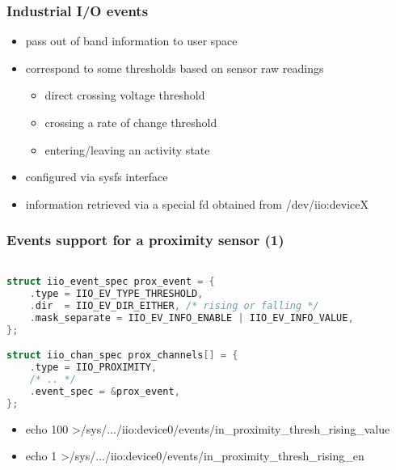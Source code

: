 \documentclass[aspectratio=169]{beamer}
\begin{document}
\begin{frame}
\frametitle{Industrial I/O events}
\begin{itemize}
    \item pass out of band information to user space
    \item correspond to some thresholds based on sensor raw readings
    \begin{itemize}
        \item direct crossing voltage threshold
        \item crossing a rate of change threshold
        \item entering/leaving an activity state
   \end{itemize}
   \item configured via sysfs interface
   \item information retrieved via a special fd obtained from /dev/iio:deviceX
\end{itemize}
\end{frame}


\begin{frame}[fragile]
\frametitle{Events support for a proximity sensor (1)}
\begin{lstlisting}[language=C]

struct iio_event_spec prox_event = {
    .type = IIO_EV_TYPE_THRESHOLD,
    .dir  = IIO_EV_DIR_EITHER, /* rising or falling */
    .mask_separate = IIO_EV_INFO_ENABLE | IIO_EV_INFO_VALUE,
};

struct iio_chan_spec prox_channels[] = {
    .type = IIO_PROXIMITY,
    /* .. */
    .event_spec = &prox_event,
};
\end{lstlisting}
\begin{itemize}
    \item echo 100 \textgreater /sys/.../iio:device0/events/in\_proximity\_thresh\_rising\_value
    \item echo 1 \textgreater /sys/.../iio:device0/events/in\_proximity\_thresh\_rising\_en
\end{itemize}
\end{frame}

\end{document}
